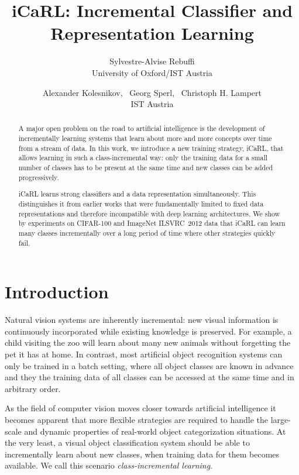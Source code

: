 \documentclass[10pt,twocolumn,letterpaper]{article}
\begin{document}
\title{iCaRL: Incremental Classifier and Representation Learning}

\author{Sylvestre-Alvise Rebuffi\\
University of Oxford/IST Austria\\
\and
Alexander Kolesnikov, \ Georg Sperl, \ Christoph H. Lampert\\
IST Austria
}

\maketitle

\begin{abstract}
A major open problem on the road to artificial intelligence 
is the development of incrementally learning systems that 
learn about more and more concepts over time from a stream 
of data.
In this work, we introduce a new training strategy, iCaRL, 
that allows learning in such a class-incremental way: 
only the training data for a small number of classes has 
to be present at the same time and new classes can be 
added progressively.

iCaRL learns strong classifiers and a data representation
simultaneously. This distinguishes it from earlier works that
were fundamentally limited to fixed data representations and
therefore incompatible with deep learning architectures.
We show by experiments on CIFAR-100 and ImageNet ILSVRC~2012 data 
that iCaRL can learn many classes incrementally over
a long period of time where other strategies quickly fail. 
\end{abstract}





\section{Introduction}\label{sec:intro}
Natural vision systems are inherently incremental: new visual 
information is continuously incorporated while existing 
knowledge is preserved. 
For example, a child visiting the zoo will learn about many 
new animals without forgetting the pet it has at home.
In contrast, most artificial
object recognition systems can only be trained in a 
batch setting, 
where all object classes are known in advance and they 
the training data of all classes can be accessed at 
the same time and in arbitrary order. 

As the field of computer vision moves closer towards 
artificial intelligence it becomes apparent that more 
flexible strategies are required to handle the large-scale 
and dynamic properties of real-world object categorization 
situations. 
At the very least, a visual object classification system
should be able to incrementally learn about new classes, 
when training data for them becomes available. 
We call this scenario \emph{class-incremental learning}.
\end{document}
